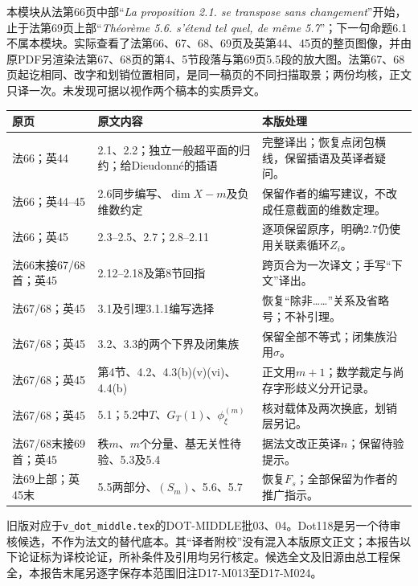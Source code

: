 
本模块从法第66页中部“\emph{La proposition 2.1. se transpose sans changement}”开始，止于法第69页上部“\emph{Th\'eor\`eme 5.6. s'\'etend tel quel, de m\^eme 5.7}”；下一句命题6.1不属本模块。实际查看了法第66、67、68、69页及英第44、45页的整页图像，并由原PDF另渲染法第67、68页的第4、5节段落与第69页5.5段的放大图。法第67、68页起讫相同、改字和划销位置相同，是同一稿页的不同扫描取景；两份均核，正文只译一次。未发现可据以视作两个稿本的实质异文。

\begin{longtable}{@{}p{}p{}p{}@{}}
\toprule 原页 & 原文内容 & 本版处理\\\midrule\endhead
法66；英44 & 2.1、2.2；独立一般超平面的归约；给Dieudonn\'e的插语 & 完整译出；恢复点闭包横线，保留插语及英译者疑问。\\
法66；英44--45 & 2.6同步编写、$\dim X-m$及负维数约定 & 保留作者的编写建议，不改成任意截面的维数定理。\\
法66；英45 & 2.3--2.5、2.7；2.8--2.11 & 逐项保留原序，明确2.7仍使用关联素循环$Z_i$。\\
法66末接67/68首；英45 & 2.12--2.18及第8节回指 & 跨页合为一次译文；手写“下文”译出。\\
法67/68；英45 & 3.1及引理3.1.1编写选择 & 恢复“除非……”关系及省略号；不补引理。\\
法67/68；英45 & 3.2、3.3的两个下界及闭集族 & 保留全部不等式；闭集族沿用$\sigma$。\\
法67/68；英45 & 第4节、4.2、4.3(b)(v)(vi)、4.4(b) & 正文用$m+1$；数学裁定与尚存字形歧义分开记录。\\
法67/68；英45 & 5.1；5.2中$T$、$G_T(1)$、$\phi^{(m)}_\xi$ & 核对载体及两次换底，划销层另记。\\
法67/68末接69首；英45 & 秩$m$、$m$个分量、基无关性待验、5.3及5.4 & 据法文改正英译$n$；保留待验提示。\\
法69上部；英45末 & 5.5两部分、$(S_m)$、5.6、5.7 & 恢复$F_s$；全部保留为作者的推广指示。\\
\bottomrule
\end{longtable}

旧版对应于\texttt{v\_dot\_middle.tex}的DOT-MIDDLE批03、04。Dot118是另一个待审核候选，不作为法文的替代底本。其“译者附校”没有混入本版原文正文；本报告以下论证标为译校论证，所补条件及引用均另行核定。候选全文及旧源由总工程保全，本报告末尾另逐字保存本范围旧注D17-M013至D17-M024。

